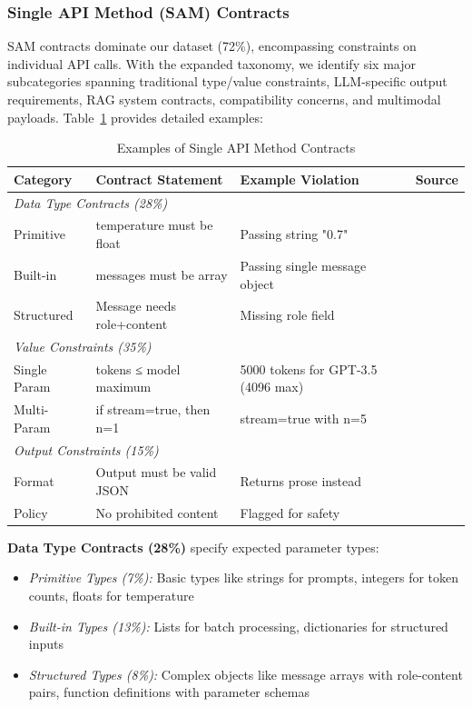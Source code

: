 \documentclass[11pt]{article}
\begin{document}
\subsubsection{Single API Method (SAM) Contracts}

SAM contracts dominate our dataset (72\%), encompassing constraints on individual API calls. With the expanded taxonomy, we identify six major subcategories spanning traditional type/value constraints, LLM-specific output requirements, RAG system contracts, compatibility concerns, and multimodal payloads. Table~\ref{tab:sam_examples} provides detailed examples:

\begin{table}[h]
\centering
\caption{Examples of Single API Method Contracts}
\label{tab:sam_examples}
\begin{tabular}{p{2.5cm}p{5cm}p{3.5cm}p{2.5cm}}
\toprule
\textbf{Category} & \textbf{Contract Statement} & \textbf{Example Violation} & \textbf{Source} \\
\midrule
\multicolumn{4}{l}{\textit{Data Type Contracts (28\%)}} \\
Primitive & temperature must be float & Passing string "0.7" & \cite{openai2023docs} \\
Built-in & messages must be array & Passing single message object & \cite{stackoverflow75971578} \\
Structured & Message needs role+content & Missing role field & \cite{githublangchain22103} \\
\midrule
\multicolumn{4}{l}{\textit{Value Constraints (35\%)}} \\
Single Param & tokens ≤ model maximum & 5000 tokens for GPT-3.5 (4096 max) & \cite{stackoverflow75396481} \\
Multi-Param & if stream=true, then n=1 & stream=true with n=5 & \cite{openai2023docs} \\
\midrule
\multicolumn{4}{l}{\textit{Output Constraints (15\%)}} \\
Format & Output must be valid JSON & Returns prose instead & \cite{stackoverflow77944251} \\
Policy & No prohibited content & Flagged for safety & \cite{githubopenai331} \\
\bottomrule
\end{tabular}
\end{table}

\textbf{Data Type Contracts (28\%)} specify expected parameter types:
\begin{itemize}
    \item \textit{Primitive Types (7\%):} Basic types like strings for prompts, integers for token counts, floats for temperature~\cite{openai2023docs}
    \item \textit{Built-in Types (13\%):} Lists for batch processing, dictionaries for structured inputs~\cite{stackoverflow78566807}
    \item \textit{Structured Types (8\%):} Complex objects like message arrays with role-content pairs, function definitions with parameter schemas~\cite{githubopenai703}
\end{itemize}
\end{document}
